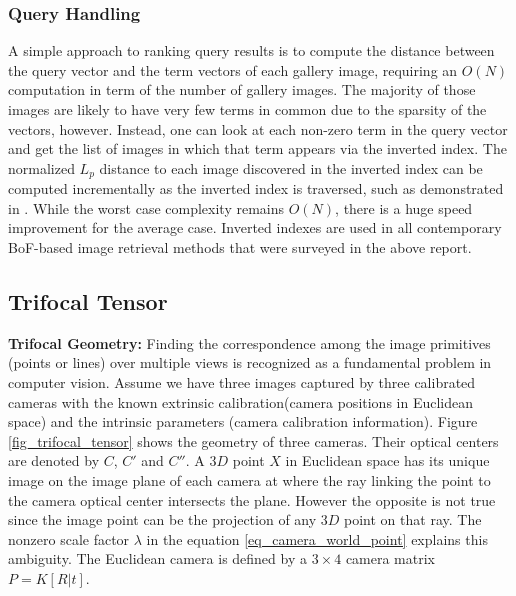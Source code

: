 \subsubsection{Query Handling}
A simple approach to ranking query results is to compute the distance between the query
vector and the term vectors of each gallery image, requiring an $O(N)$ computation in term
of the number of gallery images. The majority of those images are likely to have very few
terms in common due to the sparsity of the vectors, however. Instead, one can look at each
non-zero term in the query vector and get the list of images in which that term appears via
the inverted index. The normalized $L_p$ distance to each image discovered in the inverted index can be computed incrementally as the inverted index is traversed, such as demonstrated in \cite{nister2006scalable}. While the worst case complexity remains $O(N)$, there is a huge speed improvement for the average case. Inverted indexes are used in all contemporary BoF-based image retrieval methods that were surveyed in the above report.


\subsection{Trifocal Tensor}
\textbf{Trifocal Geometry:} Finding the correspondence among the image primitives (points or lines) over multiple views
is recognized as a fundamental problem in computer vision. Assume we have three images
captured by three calibrated cameras with the known extrinsic calibration(camera positions in Euclidean space) 
and the intrinsic parameters (camera calibration information). Figure \ref{fig_trifocal_tensor} shows the geometry of three cameras. Their optical
centers are denoted by $C$, $C'$ and $C''$. A $3D$ point $X$ in Euclidean space has its
unique image on the image plane of each camera at where the ray linking the point
to the camera optical center intersects the plane. However the opposite is not true
since the image point can be the projection of any $3D$ point on that ray. The nonzero scale factor $\lambda$ in the equation \ref{eq_camera_world_point} explains this ambiguity. The Euclidean camera is defined by a $3\times4$ camera matrix $P=K[R|t]$.

